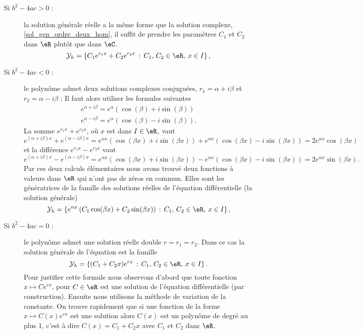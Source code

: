 \begin{description}
  \item[Si $b^2 - 4ac >0$ :] la solution générale réelle a la m\^eme forme que la solution complexe, \eqref{sol_gen_ordre_deux_hom}, il suffit de prendre les paramètres $C_1$ et $C_2$ dans $\eR$ plut\^ot que dans $\eC$. 
\begin{equation}\label{sol_gen_reelle_ordre_deux_hom}
  \mathcal{Y}_h  = \left\{C_1 e^{r_1x} +C_2 e^{r_2x} \,:\, C_1,\, C_2 \in \eR, \: x\in I\right\},
\end{equation}
  \item[Si $b^2 - 4ac <0$ :] le polynôme admet deux solutions complexes conjuguées, $r_1 = \alpha + i \beta$ et $r_2 = \alpha - i \beta$ ; Il faut alors utiliser les formules suivantes 
    \begin{equation}
      \begin{array}{l}
        e^{\alpha + i \beta} =e^{\alpha}(\cos(\beta) + i \sin(\beta))\\
        e^{\alpha - i \beta} =e^{\alpha}(\cos(\beta) - i \sin(\beta)).
      \end{array}
    \end{equation}
    La somme $e^{r_1x} +e^{r_2x}$, où $x$ est dans $I\in\eR$, vaut 
    \[
    e^{(\alpha + i \beta)x} + e^{(\alpha - i \beta)x}=e^{\alpha x}(\cos(\beta x) + i \sin(\beta x )) + e^{\alpha x}(\cos(\beta x) - i \sin(\beta x)) =2 e^{\alpha x}\cos(\beta x)
    \]
    et la différence $e^{r_1x} -e^{r_2x}$ vaut
    \[
    e^{(\alpha + i \beta)x} - e^{(\alpha - i \beta)x}=e^{\alpha x}(\cos(\beta x) + i \sin(\beta x )) - e^{\alpha x}(\cos(\beta x) - i \sin(\beta x)) =2 e^{\alpha x}\sin(\beta x).
    \]
    Par ces deux calculs élémentaires nous avons trouvé deux fonctions à valeurs dans $\eR$ qui n'ont pas de zéros en commun. Elles sont les génératrices de la famille des solutions réelles de l'équation différentielle (la solution générale)
    \begin{equation}\label{sol_gen_reelle_ordre_deux_hom_complconj}
      \mathcal{Y}_h  = \left\{ e^{\alpha x}\left(C_1\cos(\beta x) +C_2\sin(\beta x)\right)  \,:\, C_1,\, C_2 \in \eR, \: x\in I\right\},
    \end{equation}
  \item[Si $b^2 - 4ac =0$ :] le polynôme admet une solution réelle double $r=r_1 = r_2$. Dans ce cas la solution générale de l'équation est la famille
    \begin{equation}\label{sol_gen_reelle_ordre_deux_hom_doublerac}
      \mathcal{Y}_h  = \left\{(C_1  +C_2x) e^{r x} \,:\, C_1,\, C_2 \in \eR, \: x\in I\right\}.
    \end{equation} 
    Pour justifier cette formule nous observons d'abord que toute fonction $x\mapsto Ce^{rx}$, pour $C\in\eR$ est une solution de l'équation différentielle (par construction). Ensuite nous utilisons la méthode de variation de la constante. On trouve rapidement que si une fonction de la forme $x\mapsto C(x)e^{rx}$ est une solution alors $C(x)$ est un polynôme de degré au plus 1, c'est à dire $C(x) = C_1 + C_2 x$ avec $C_1$ et $C_2$ dans $\eR$. 
\end{description}

